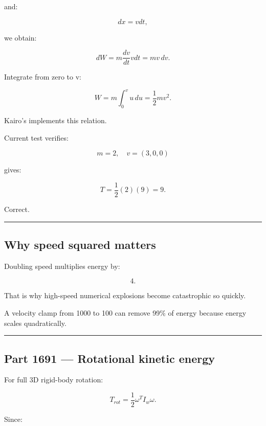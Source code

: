 and:

\[
dx=vdt,
\]

we obtain:

\[
dW
=
m\frac{dv}{dt}vdt
=
mv\,dv.
\]

Integrate from zero to v:

\[
W
=
m\int_0^v u\,du
=
\frac12mv^2.
\]

Kairo's  implements this relation.

Current test verifies:

\[
m=2,
\quad
v=(3,0,0)
\]

gives:

\[
T=
\frac12(2)(9)=9.
\]

Correct.

\begin{center}\rule{0.5\linewidth}{0.5pt}\end{center}

\subsection{Why speed squared matters}\label{06-engine-ii-ch039-why-speed-squared-matters}

\hypertarget{06-engine-ii-ch039-why-speed-squared-matters}{}

Doubling speed multiplies energy by:

\[
4.
\]

That is why high-speed numerical explosions become catastrophic so quickly.

A velocity clamp from 1000 to 100 can remove 99\% of energy because energy scales quadratically.

\begin{center}\rule{0.5\linewidth}{0.5pt}\end{center}

\subsection{Part 1691 --- Rotational kinetic energy}\label{06-engine-ii-ch039-part-1691-rotational-kinetic-energy}

\hypertarget{06-engine-ii-ch039-part-1691-rotational-kinetic-energy}{}

For full 3D rigid-body rotation:

\[
\boxed{
T_{rot}
=
\frac12
\omega^T
I_w
\omega.
}
\]

Since:

